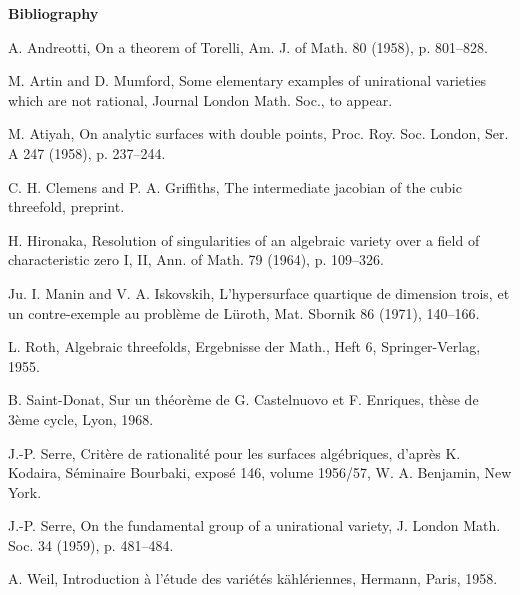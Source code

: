 \documentclass[10pt]{article}
\begin{document}
\begin{center}\bfseries Bibliography\end{center}
\begin{enumerate}[label={[\arabic*]}]
\item A. Andreotti, On a theorem of Torelli, Am. J. of Math. 80 (1958), p. 801--828.
\item M. Artin and D. Mumford, Some elementary examples of unirational varieties which are not rational, Journal London Math. Soc., to appear.
\item M. Atiyah, On analytic surfaces with double points, Proc. Roy. Soc. London, Ser. A 247 (1958), p. 237--244.
\item C. H. Clemens and P. A. Griffiths, The intermediate jacobian of the cubic threefold, preprint.
\item H. Hironaka, Resolution of singularities of an algebraic variety over a field of characteristic zero I, II, Ann. of Math. 79 (1964), p. 109--326.
\item Ju. I. Manin and V. A. Iskovskih, L'hypersurface quartique de dimension trois, et un contre-exemple au problème de Lüroth, Mat. Sbornik 86 (1971), 140--166.
\item L. Roth, Algebraic threefolds, Ergebnisse der Math., Heft 6, Springer-Verlag, 1955.
\item B. Saint-Donat, Sur un théorème de G. Castelnuovo et F. Enriques, thèse de 3ème cycle, Lyon, 1968.
\item J.-P. Serre, Critère de rationalité pour les surfaces algébriques, d'après K. Kodaira, Séminaire Bourbaki, exposé 146, volume 1956/57, W. A. Benjamin, New York.
\item J.-P. Serre, On the fundamental group of a unirational variety, J. London Math. Soc. 34 (1959), p. 481--484.
\item A. Weil, Introduction à l'étude des variétés kählériennes, Hermann, Paris, 1958.
\end{enumerate}
\end{document}
